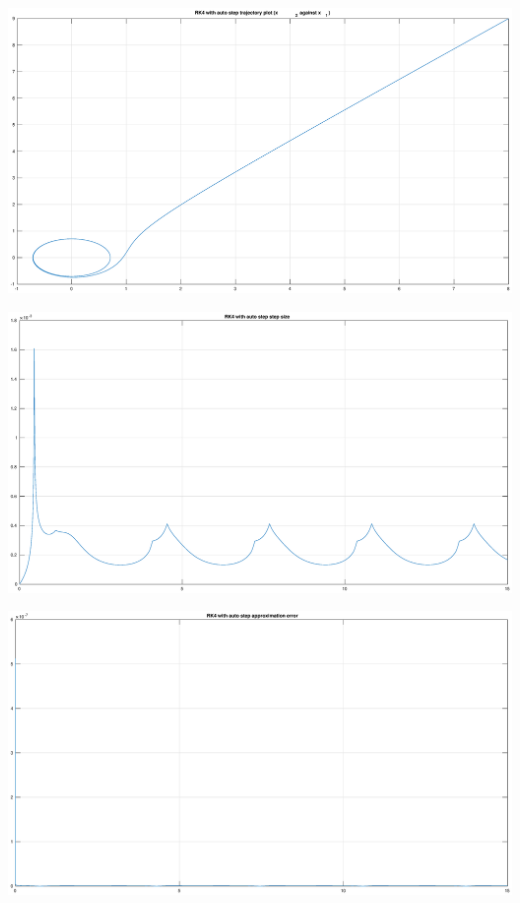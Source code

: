 \documentclass[12pt]{report}
\begin{document}
\begin{center}
   \includegraphics[scale=0.25]{26.eps}
\end{center}

\begin{center}
   \includegraphics[scale=0.25]{27.eps}
\end{center}

\begin{center}
   \includegraphics[scale=0.25]{28.eps}
\end{center}
\end{document}
